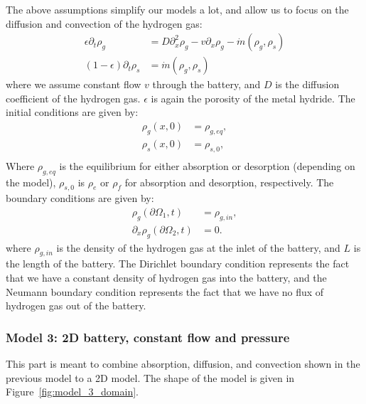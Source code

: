 The above assumptions simplify our models a lot, and allow us to focus on the diffusion and convection of the hydrogen gas:
\begin{subequations}\label{eq:phy_model_2}
    \begin{align}
        \epsilon\partial_t \rho_g &= D \partial_x^2 \rho_g - v \partial_x\rho_g - \dot{m}(\rho_g, \rho_s) \\
        (1-\epsilon)\partial_t \rho_s &= \dot{m}(\rho_g, \rho_s)
    \end{align}
\end{subequations}
where we assume constant flow $v$ through the battery, and $D$ is the diffusion coefficient of the hydrogen gas. $\epsilon$ is again the porosity of the metal hydride. The initial conditions are given by:
\begin{subequations}\label{eq:phy_model_2_ic}
    \begin{align}
    \rho_g(x, 0)  &= \rho_{g,eq},\\
    \rho_s(x,0) &= \rho_{s,0},\\
    \end{align}
\end{subequations}
Where $\rho_{g,eq}$ is the equilibrium for either absorption or desorption (depending on the model),
$\rho_{s,0}$ is $\rho_{e}$ or $\rho_f$ for absorption and desorption, respectively. The boundary conditions are given by:
\begin{subequations}\label{eq:phy_model_2_bc}
    \begin{align}
        \rho_g(\partial\Omega_1,t) &= \rho_{g,in}, \\
        \partial_x \rho_g(\partial\Omega_2,t) &= 0.
    \end{align}
\end{subequations}
where $\rho_{g,in}$ is the density of the hydrogen gas at the inlet of the battery, and $L$ is the length of the battery. The Dirichlet boundary condition represents the fact that we have a constant density of hydrogen gas into the battery, and the Neumann boundary condition represents the fact that we have no flux of hydrogen gas out of the battery.

\subsubsection*{Model 3: 2D battery, constant flow and pressure}
This part is meant to combine absorption, diffusion, and convection shown in the previous model to a 2D model. The shape of the model is given in Figure~\ref{fig:model_3_domain}.

